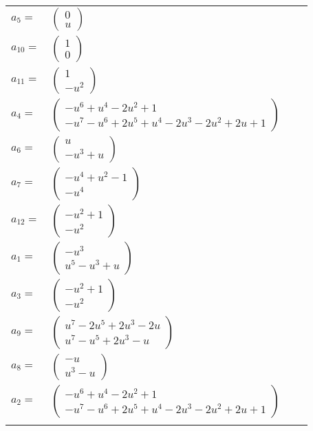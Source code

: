 \documentclass[1p]{elsarticle_modified}
\theoremstyle{definition}
\begin{document}
\begin{tabular}{m{7pt} m{180pt} m{7pt} m{180pt} }
\flushright $a_{5}=$&$\begin{pmatrix}0\\u\end{pmatrix}$ \\
\flushright $a_{10}=$&$\begin{pmatrix}1\\0\end{pmatrix}$ \\
\flushright $a_{11}=$&$\begin{pmatrix}1\\- u^2\end{pmatrix}$ \\
\flushright $a_{4}=$&$\begin{pmatrix}- u^6+u^4-2 u^2+1\\- u^7- u^6+2 u^5+u^4-2 u^3-2 u^2+2 u+1\end{pmatrix}$ \\
\flushright $a_{6}=$&$\begin{pmatrix}u\\- u^3+u\end{pmatrix}$ \\
\flushright $a_{7}=$&$\begin{pmatrix}- u^4+u^2-1\\- u^4\end{pmatrix}$ \\
\flushright $a_{12}=$&$\begin{pmatrix}- u^2+1\\- u^2\end{pmatrix}$ \\
\flushright $a_{1}=$&$\begin{pmatrix}- u^3\\u^5- u^3+u\end{pmatrix}$ \\
\flushright $a_{3}=$&$\begin{pmatrix}- u^2+1\\- u^2\end{pmatrix}$ \\
\flushright $a_{9}=$&$\begin{pmatrix}u^7-2 u^5+2 u^3-2 u\\u^7- u^5+2 u^3- u\end{pmatrix}$ \\
\flushright $a_{8}=$&$\begin{pmatrix}- u\\u^3- u\end{pmatrix}$ \\
\flushright $a_{2}=$&$\begin{pmatrix}- u^6+u^4-2 u^2+1\\- u^7- u^6+2 u^5+u^4-2 u^3-2 u^2+2 u+1\end{pmatrix}$\\&\end{tabular}
\end{document}
